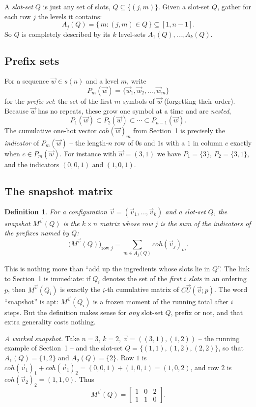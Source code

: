 \documentclass{article}
\newtheorem{definition}[theorem]{Definition}
\begin{document}
\label{def:slot}A \emph{slot-set} $Q$ is just any set of slots, $Q\subseteq\{(j,m)\}$.  Given a
slot-set $Q$, gather for each row $j$ the levels it contains:
\[
A_j(Q)=\{\,m:(j,m)\in Q\,\}\subseteq[1,n-1].
\]
So $Q$ is completely described by its $k$ level-sets $A_1(Q),\ldots,A_k(Q)$.

\subsection*{Prefix sets}

\label{def:prefix}For a sequence $\vec w\in s(n)$ and a level $m$, write
\[
P_m(\vec w)=\{\vec w_1,\vec w_2,\ldots,\vec w_m\}
\]
for the \emph{prefix set}: the set of the first $m$ symbols of $\vec w$ (forgetting
their order).  Because $\vec w$ has no repeats, these grow one symbol at a time and
are \emph{nested},
\[
P_1(\vec w)\subset P_2(\vec w)\subset\cdots\subset P_{n-1}(\vec w).
\]
The cumulative one-hot vector $coh(\vec w)_m$ from Section~1 is precisely the
\emph{indicator} of $P_m(\vec w)$ -- the length-$n$ row of $0$s and $1$s with a $1$
in column $c$ exactly when $c\in P_m(\vec w)$.  For instance with $\vec w=(3,1)$ we
have $P_1=\{3\}$, $P_2=\{3,1\}$, and the indicators $(0,0,1)$ and $(1,0,1)$.

\subsection*{The snapshot matrix}

\begin{definition}\label{def:snapshot}
For a configuration $\vec v=(\vec v_1,\ldots,\vec v_k)$ and a slot-set $Q$, the
\emph{snapshot} $M^{\vec v}(Q)$ is the $k\times n$ matrix whose row $j$ is the sum
of the indicators of the prefixes named by $Q$:
\[
\bigl(M^{\vec v}(Q)\bigr)_{\text{row }j}
=\sum_{m\in A_j(Q)} coh(\vec v_j)_m .
\]
\end{definition}

This is nothing more than ``add up the ingredients whose slots lie in $Q$''.  The
link to Section~1 is immediate: if $Q_i$ denotes the set of the \emph{first $i$
slots} in an ordering $p$, then $M^{\vec v}(Q_i)$ is exactly the $i$-th cumulative
matrix of $C\vec U(\vec v;p)$.  The word ``snapshot'' is apt: $M^{\vec v}(Q_i)$ is
a frozen moment of the running total after $i$ steps.  But the definition makes
sense for \emph{any} slot-set $Q$, prefix or not, and that extra generality costs
nothing.

\medskip
\noindent\textit{A worked snapshot.}  Take $n=3$, $k=2$, $\vec v=((3,1),(1,2))$ --
the running example of Section~1 -- and the slot-set
$Q=\{(1,1),(1,2),(2,2)\}$, so that $A_1(Q)=\{1,2\}$ and $A_2(Q)=\{2\}$.  Row $1$ is
$coh(\vec v_1)_1+coh(\vec v_1)_2=(0,0,1)+(1,0,1)=(1,0,2)$, and row $2$ is
$coh(\vec v_2)_2=(1,1,0)$.  Thus
\[
M^{\vec v}(Q)=\begin{bmatrix}1&0&2\\[1pt]1&1&0\end{bmatrix}.
\]
\end{document}

